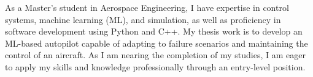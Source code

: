 \begin{cvparagraph}
As a Master's student in Aerospace Engineering, I have expertise in control systems, machine learning (ML), and simulation, as well as proficiency in software development using Python and C++. My thesis work is to develop an ML-based autopilot capable of adapting to failure scenarios and maintaining the control of an aircraft. As I am nearing the completion of my studies, I am eager to apply my skills and knowledge professionally through an entry-level position.
\end{cvparagraph}